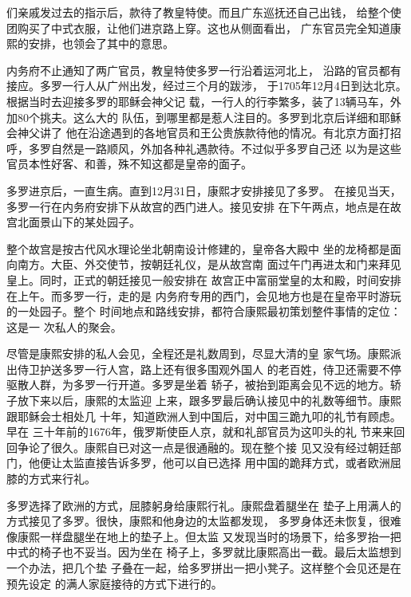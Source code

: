 们亲戚发过去的指示后，款待了教皇特使。而且广东巡抚还自己出钱，%
给整个使团购买了中式衣服，让他们进京路上穿。这也从侧面看出，%
广东官员完全知道康熙的安排，也领会了其中的意思。%
\par
内务府不止通知了两广官员，教皇特使多罗一行沿着运河北上，%
沿路的官员都有接应。多罗一行人从广州出发，经过三个月的跋涉，%
于1705年12月4日到达北京。根据当时去迎接多罗的耶稣会神父记%
载，一行人的行李繁多，装了13辆马车，外加80个挑夫。这么大的%
队伍，到哪里都是惹人注目的。多罗到北京后详细和耶稣会神父讲了%
他在沿途遇到的各地官员和王公贵族款待他的情况。有北京方面打招%
呼，多罗自然是一路顺风，外加各种礼遇款待。不过似乎多罗自己还%
以为是这些官员本性好客、和善，殊不知这都是皇帝的面子。%
\par
多罗进京后，一直生病。直到12月31日，康熙才安排接见了多罗。%
在接见当天，多罗一行在内务府安排下从故宫的西门进人。接见安排%
在下午两点，地点是在故宫北面景山下的某处园子。%
\par
整个故宫是按古代风水理论坐北朝南设计修建的，皇帝各大殿中%
坐的龙椅都是面向南方。大臣、外交使节，按朝廷礼仪，是从故宫南%
面过午门再进太和门来拜见皇上。同时，正式的朝廷接见一般安排在%
故宫正中富丽堂皇的太和殿，时间安排在上午。而多罗一行，走的是%
内务府专用的西门，会见地方也是在皇帝平时游玩的一处园子。整个%
时间地点和路线安排，都符合康熙最初策划整件事情的定位：这是一%
次私人的聚会。%
\par
尽管是康熙安排的私人会见，全程还是礼数周到，尽显大清的皇%
家气场。康熙派出侍卫护送多罗一行人宫，路上还有很多围观外国人%
的老百姓，侍卫还需要不停驱散人群，为多罗一行开道。多罗是坐着%
轿子，被抬到距离会见不远的地方。轿子放下来以后，康熙的太监迎%
上来，跟多罗最后确认接见中的礼数等细节。康熙跟耶稣会士相处几%
十年，知道欧洲人到中国后，对中国三跪九叩的礼节有顾虑。早在%
三十年前的1676年，俄罗斯使臣人京，就和礼部官员为这叩头的礼%
节来来回回争论了很久。康熙自已对这一点是很通融的。现在整个接%
见又没有经过朝廷部门，他便让太监直接告诉多罗，他可以自已选择%
用中国的跪拜方式，或者欧洲屈膝的方式来行礼。%
\par
多罗选择了欧洲的方式，屈膝躬身给康熙行礼。康熙盘着腿坐在%
垫子上用满人的方式接见了多罗。很快，康熙和他身边的太监都发现，%
多罗身体还未恢复，很难像康熙一样盘腿坐在地上的垫子上。但太监%
又发现当时的场景下，给多罗抬一把中式的椅子也不妥当。因为坐在%
椅子上，多罗就比康熙高出一截。最后太监想到一个办法，把几个垫%
子叠在一起，给多罗拼出一把小凳子。这样整个会见还是在预先设定%
的满人家庭接待的方式下进行的。%
